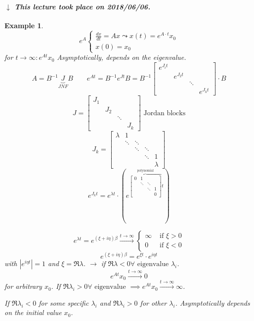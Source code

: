 \documentclass{article}
\newcounter{lecref}[section]
\numberwithin{lecref}{section}
\newtheorem{example}[lecref]{Example}
\newcommand{\card}[1]{\left|#1\right|}
\newcommand{\dateref}[1]{%
  \begin{mdframed}[backgroundcolor=gray!10,innerbottommargin=0pt,innertopmargin=0pt]
    \paragraph{\textit{$\downarrow$ This lecture took place on #1.}}%
  \end{mdframed}%
}
\begin{document}
\dateref{2018/06/06}

\begin{example} %
  \[ e^A \begin{cases} \frac{dx}{dt} = Ax \leadsto x(t) = e^{A \cdot t} x_0 \\ x(0) = x_0 \end{cases} \]
  for $t \to \infty: e^{At} x_0$
  Asymptotically, depends on the eigenvalue.
  \[ A = B^{-1} \underbrace{J}_{JNF} B \qquad e^{At} = B^{-1} e^{Jt} B = B^{-1} \begin{bmatrix} e^{J_it} & & & \\ & e^{J_2 t} & & \\ & & \ddots & \\ & & & e^{J_k t} \end{bmatrix} \cdot B \]
  \[ J = \begin{bmatrix} J_1 & & & \\ & J_2 & & \\ & & \ddots & \\ & & & J_k \end{bmatrix} \text{ Jordan blocks} \]
  \[ J_k = \begin{bmatrix} \lambda & 1 & & & \\ & \ddots & \ddots & & \\ & & \ddots & \ddots & \\ & & & \ddots & 1 \\ & & & & \lambda \end{bmatrix} \]
  \[ e^{J_k t} = e^{\lambda t} \cdot \left(e^{\overbrace{\begin{bmatrix} 0 & 1 & & \\ & \ddots & \ddots & \\ & & \ddots & 1 \\ & & & 0 \end{bmatrix}}^{\text{polynomial}} t}\right) \]

  \[ e^{\lambda t} = e^{(\xi + i \eta) \beta} \xrightarrow{t \to \infty} \begin{cases} \infty & \text{ if } \xi > 0 \\ 0 & \text{ if } \xi < 0 \end{cases} \]
  \[ e^{(\xi + i \eta) \beta} = e^{\xi t} \cdot e^{i \eta t} \]
  with $\card{e^{i \eta t}} = 1$ and $\xi = \Re{\lambda}$.
  $\to$ if $\Re{\lambda} < 0 \forall \text{ eigenvalue } \lambda_i$.
  \[ e^{At} x_0 \xrightarrow{t \to \infty} 0 \]
  for arbitrary $x_0$.
  If $\Re{\lambda_i} > 0 \forall \text{ eigenvalue}$ $\implies e^{At} x_0 \xrightarrow{t \to \infty} \infty$.

  If $\Re{\lambda_i} < 0$ for some specific $\lambda_i$ and $\Re{\lambda_i} > 0$ for other $\lambda_i$.
  Asymptotically depends on the initial value $x_0$.
\end{example}
\end{document}

